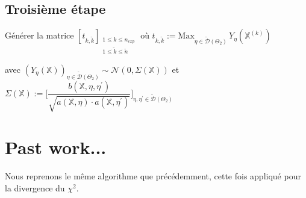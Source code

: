 \documentclass{article}
\begin{document}
    \subsection{Troisième étape}
    \begin{center}
    Générer la matrice $[t_{k,\tilde{k}}]_{\substack{1\leq k\leq n_{exp} \\ 1\leq\tilde{k}\leq\tilde{n}}}$ où $t_{k,\tilde{k}}:=\mathrm{Max}_{\eta\in\tilde{\mathcal{D}}(\Theta_2)}\,Y_\eta(\mathbb{X}^{(k)})$
        \begin{flushright}
            avec $(Y_\eta(\mathbb{X}))_{\eta\in\tilde{\mathcal{D}}(\Theta_2)}\sim\mathcal{N}(0,\Sigma(\mathbb{X}))$ et $\Sigma(\mathbb{X}):=\Big[\dfrac{b(\mathbb{X,\eta,\eta^\prime})}{\sqrt{a(\mathbb{X},\eta)\cdot{}a(\mathbb{X},\eta^\prime)}}\Big]_{\eta,\eta^\prime\in\tilde{\mathcal{D}}(\Theta_2)}$
        \end{flushright}
    \end{center}





































    
    
    \newpage
    \section{Past work...}


 
    Nous reprenons le même algorithme que précédemment, cette fois appliqué pour la divergence du $\chi^2$. \\
\end{document}
